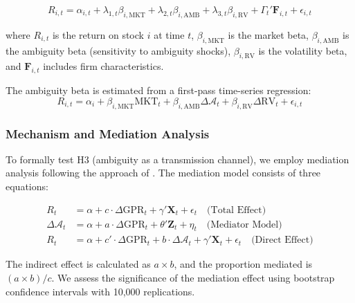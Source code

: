 \documentclass[preprint,12pt,authoryear]{elsarticle}
\begin{document}
\begin{equation}
R_{i,t} = \alpha_{i,t} + \lambda_{1,t} \beta_{i,\text{MKT}} + \lambda_{2,t} \beta_{i,\text{AMB}} + \lambda_{3,t} \beta_{i,\text{RV}} + \Gamma_{t}' \mathbf{F}_{i,t} + \epsilon_{i,t}
\end{equation}

where $R_{i,t}$ is the return on stock $i$ at time $t$, $\beta_{i,\text{MKT}}$ is the market beta, $\beta_{i,\text{AMB}}$ is the ambiguity beta (sensitivity to ambiguity shocks), $\beta_{i,\text{RV}}$ is the volatility beta, and $\mathbf{F}_{i,t}$ includes firm characteristics.

The ambiguity beta is estimated from a first-pass time-series regression:
\begin{equation}
R_{i,t} = \alpha_i + \beta_{i,\text{MKT}} \text{MKT}_t + \beta_{i,\text{AMB}} \Delta \mathcal{A}_t + \beta_{i,\text{RV}} \Delta \text{RV}_t + \epsilon_{i,t}
\end{equation}

\subsubsection{Mechanism and Mediation Analysis}

To formally test H3 (ambiguity as a transmission channel), we employ mediation analysis following the approach of \citet{Baron1986Moderator}. The mediation model consists of three equations:

\begin{align}
R_{t} &= \alpha + c \cdot \Delta \text{GPR}_{t} + \gamma' \mathbf{X}_{t} + \epsilon_{t} \quad \text{(Total Effect)} \\
\Delta \mathcal{A}_{t} &= \alpha + a \cdot \Delta \text{GPR}_{t} + \theta' \mathbf{Z}_{t} + \eta_{t} \quad \text{(Mediator Model)} \\
R_{t} &= \alpha + c' \cdot \Delta \text{GPR}_{t} + b \cdot \Delta \mathcal{A}_{t} + \gamma' \mathbf{X}_{t} + \epsilon_{t} \quad \text{(Direct Effect)}
\end{align}

The indirect effect is calculated as $a \times b$, and the proportion mediated is $(a \times b) / c$. We assess the significance of the mediation effect using bootstrap confidence intervals with 10,000 replications.
\end{document}
